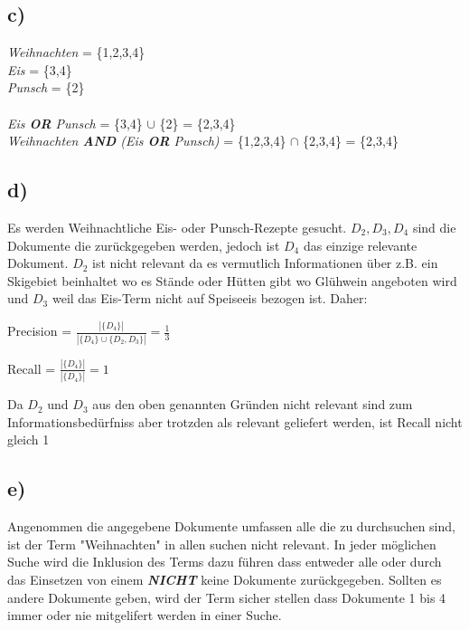 \documentclass[11pt,a4paper,parskip=half ]{scrartcl}
\begin{document}
	\subsection*{c)}
		\textit{Weihnachten}	= \{1,2,3,4\} 	\\
		\textit{Eis}	= \{3,4\}	\\
		\textit{Punsch}	= \{2\}	\\	~\\
		\textit{Eis \textbf{OR} Punsch}	= \{3,4\} $\cup$ \{2\} = \{2,3,4\}	\\
		\textit{Weihnachten \textbf{AND} (Eis \textbf{OR} Punsch)}	= \{1,2,3,4\} $\cap$ \{2,3,4\} = \{2,3,4\}	\\
		
	\subsection*{d)} Es werden Weihnachtliche Eis- oder Punsch-Rezepte gesucht. $D_{2},D_{3},D_{4}$ sind die Dokumente die zurückgegeben werden, jedoch ist $D_{4}$ das einzige relevante Dokument. $D_{2}$ ist nicht relevant da es vermutlich Informationen über z.B. ein Skigebiet beinhaltet wo es Stände oder Hütten gibt wo Glühwein angeboten wird und $D_{3}$ weil das Eis-Term nicht auf Speiseeis bezogen ist. Daher:
	
	Precision = $\frac{|\{D_{4}\}|}{|\{D_{4}\}\cup\{D_{2},D_{3}\}|} = \frac{1}{3}$
	
	Recall = $\frac{|\{D_{4}\}|}{|\{D_{4}\}|} = 1$
	
	Da $D_{2}$ und $D_{3}$ aus den oben genannten Gründen nicht relevant sind zum Informationsbedürfniss aber trotzden als relevant geliefert werden, ist Recall nicht gleich 1
	
	\subsection*{e)} Angenommen die angegebene Dokumente umfassen alle die zu durchsuchen sind, ist der Term "Weihnachten" in allen suchen nicht relevant. In jeder möglichen Suche wird die Inklusion des Terms dazu führen dass entweder alle oder durch das Einsetzen von einem \textbf{\textit{NICHT}} keine Dokumente zurückgegeben. Sollten es andere Dokumente geben, wird der Term sicher stellen dass Dokumente 1 bis 4 immer oder nie mitgelifert werden in einer Suche.

	
	
	
\end{document}

